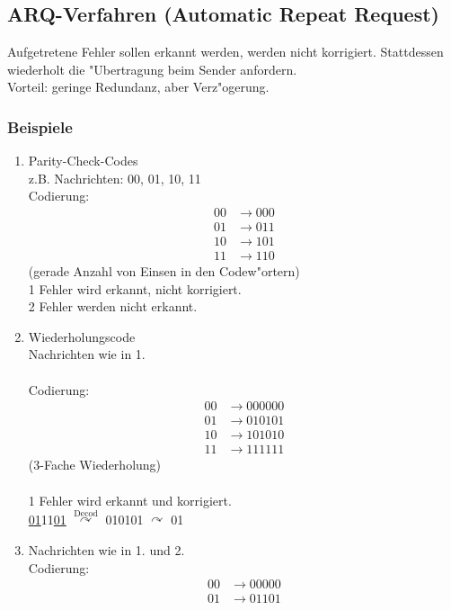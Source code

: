 \subsection{ARQ-Verfahren (Automatic Repeat Request)}
Aufgetretene Fehler sollen erkannt werden, werden nicht korrigiert. Stattdessen  wiederholt die "Ubertragung beim Sender anfordern.\\
Vorteil: geringe Redundanz, aber Verz"ogerung.
\subsubsection{Beispiele}
\begin{enumerate}
	\item Parity-Check-Codes\\
		z.B. Nachrichten: 00, 01, 10, 11\\
		Codierung:
		\begin{align*}
			00 &\rightarrow 000\\
			01 &\rightarrow 011\\
			10 &\rightarrow 101\\
			11 &\rightarrow 110
		\end{align*}
		(gerade Anzahl von Einsen in den Codew"ortern)\\
		1 Fehler wird erkannt, nicht korrigiert.\\
		2 Fehler werden nicht erkannt.
	\item Wiederholungscode\\
		Nachrichten wie in 1.\\
		\\
		Codierung:
		\begin{align*}
			00 &\rightarrow 000000\\
			01 &\rightarrow 010101\\
			10 &\rightarrow 101010\\
			11 &\rightarrow 111111
		\end{align*}	
		(3-Fache Wiederholung)\\
		\\
		1 Fehler wird erkannt und korrigiert.\\
		\underline{01}11\underline{01} $\overset{\text{Decod}}{\curvearrowright}$ 010101 $\curvearrowright$ 01
	\item Nachrichten wie in 1. und 2. \\
		Codierung:
		\begin{align*}
			00 &\rightarrow 00000\\
			01 &\rightarrow 01101\\

\end{align*}
\end{enumerate}
